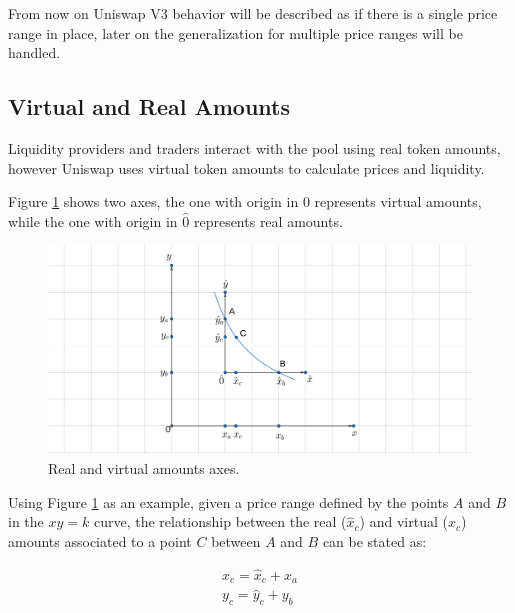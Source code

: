 \documentclass{article}
\begin{document}
From now on Uniswap V3 behavior will be described as if there is a single price range in place, later on the generalization for multiple price ranges will be handled.

\subsection{Virtual and Real Amounts}

Liquidity providers and traders interact with the pool using real token amounts, however Uniswap uses virtual token amounts to calculate prices and liquidity.

Figure \ref{figure:uniswap_v3} shows two axes, the one with origin in $0$ represents virtual amounts, while the one with origin in $\hat{0}$ represents real amounts.

\begin{figure}[h]
\label{figure:uniswap_v3}
\includegraphics[scale=1.6]{uniswap_v3}
\centering
\caption{Real and virtual amounts axes.}
\end{figure}

Using Figure \ref{figure:uniswap_v3} as an example, given a price range defined by the points $A$ and $B$ in the $xy=k$ curve, the relationship between the real ($\hat{x}_c$) and virtual ($x_c$) amounts associated to a point $C$ between $A$ and $B$ can be stated as:

\begin{equation}
    \label{equation:virtual_amounts}
    \begin{split}
        x_c=\hat{x}_c + x_a \\
        y_c=\hat{y}_c + y_b \\
    \end{split}
\end{equation}
\end{document}
